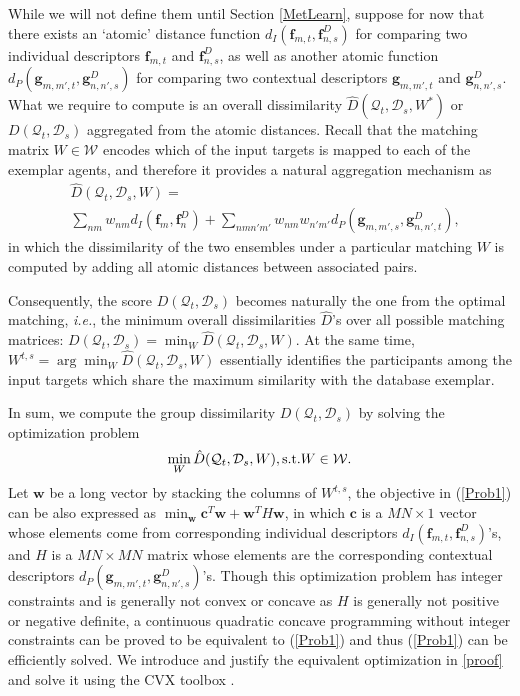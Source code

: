\documentclass[10pt,twocolumn,letterpaper]{article}
\begin{document}
While we will not define them until Section \ref{MetLearn}, suppose for now that there exists an `atomic' distance function $d_{I}(\mathbf{f}_{m,t}, \mathbf{f}^{D}_{n,s}) $ for comparing two individual descriptors $\mathbf{f}_{m,t}$ and $\mathbf{f}^{D}_{n,s}$, as well as another atomic function $d_{P}(\mathbf{g}_{m,m',t}, \mathbf{g}^{D}_{n,n',s}) $ for comparing two contextual descriptors $\mathbf{g}_{m,m',t}$ and $\mathbf{g}^{D}_{n,n',s}$. What we require to compute is an overall dissimilarity $\hat{D}(\mathcal{Q}_{t}, \mathcal{D}_{s}, W^{*})$ or $D(\mathcal{Q}_{t}, \mathcal{D}_{s})$ aggregated from the atomic distances. Recall that the  matching matrix $W\in\mathcal{W}$ encodes which of the input targets is mapped to each of the exemplar agents, and therefore it provides a natural aggregation mechanism as 
\begin{equation}
\begin{split}
&\hat{D}(\mathcal{Q}_{t}, \mathcal{D}_{s}, W)=\\
&\sum_{nm}w_{nm}d_{I}(\mathbf{f}_{m}, \mathbf{f}^{D}_{n})+\sum_{nmn'm'}w_{nm}w_{n'm'}d_{P}(\mathbf{g}_{m,m',s}, \mathbf{g}^{D}_{n,n',t}),
\end{split}
\end{equation}
in which the dissimilarity of the two ensembles under a particular matching $W$ is computed by adding all atomic distances between associated pairs.

Consequently, the score $D(\mathcal{Q}_{t}, \mathcal{D}_{s})$ becomes naturally the one from the optimal matching, \textit{i.e.}, the minimum overall dissimilarities $\hat{D}$'s over all possible matching matrices: $D(\mathcal{Q}_{t}, \mathcal{D}_{s})=\min_{W}\hat{D}(\mathcal{Q}_{t}, \mathcal{D}_{s}, W)$. At the same time, $W^{t,s}=\arg\min_{W}\hat{D}(\mathcal{Q}_{t}, \mathcal{D}_{s}, W)$ essentially identifies the participants among the input targets which share the maximum similarity with the database exemplar. 
 
 In sum, we compute the group dissimilarity $D(\mathcal{Q}_{t}, \mathcal{D}_{s})$ by solving the optimization problem
\begin{equation}
\label{Prob1}
\min_{W}\hat{D}(\mathcal{Q}_{t}, \mathcal{D}_{s}, W), \textup{s.t.} W\in\mathcal{W}.
\end{equation}
Let $\mathbf{w}$ be a long vector by stacking the columns of $W^{t,s}$, the objective in (\ref{Prob1}) can be also expressed as $\min_{\mathbf{w}}\mathbf{c}^{T}\mathbf{w}+\mathbf{w}^{T}H\mathbf{w}$, in which $\mathbf{c}$ is a $MN\times 1$ vector whose elements come from corresponding individual descriptors $d_{I}(\mathbf{f}_{m,t}, \mathbf{f}^{D}_{n,s})$'s, and $H$ is a $MN\times MN$ matrix whose elements are the corresponding contextual descriptors $d_{P}(\mathbf{g}_{m,m',t}, \mathbf{g}^{D}_{n,n',s})$'s. Though this optimization problem has integer constraints and is generally not convex or concave as $H$ is generally not positive or negative definite, a continuous quadratic concave programming without integer constraints can be proved to be equivalent to (\ref{Prob1}) and thus (\ref{Prob1}) can be efficiently solved. We introduce and justify the equivalent optimization in \ref{proof} and solve it using the CVX toolbox \cite{cvx}.
\end{document}

